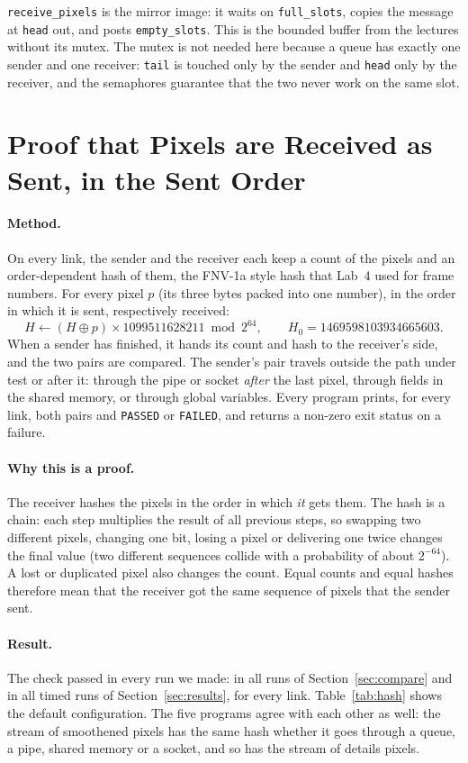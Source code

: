 \documentclass[11pt,a4paper]{article}
\begin{document}
\noindent \texttt{receive\_pixels} is the mirror image: it waits on \texttt{full\_slots}, copies the
message at \texttt{head} out, and posts \texttt{empty\_slots}. This is the bounded buffer from the
lectures without its mutex. The mutex is not needed
here because a queue has exactly one sender and one receiver: \texttt{tail} is touched only by the
sender and \texttt{head} only by the receiver, and the semaphores guarantee that the two never work
on the same slot.

\section{Proof that Pixels are Received as Sent, in the Sent Order}
\label{sec:proof}

\paragraph{Method.} On every link, the sender and the receiver each keep a count of the pixels and
an order-dependent hash of them, the FNV-1a style hash that Lab~4 used for frame numbers. For every
pixel $p$ (its three bytes packed into one number), in the order in which it is sent, respectively
received:
\[ H \leftarrow (H \oplus p) \times 1099511628211 \bmod 2^{64}, \qquad H_0 = 1469598103934665603. \]
When a sender has finished, it hands its count and hash to the receiver's side, and the two pairs are
compared. The sender's pair travels outside the path under test or after it: through the pipe or
socket \emph{after} the last pixel, through fields in the shared memory, or through global variables.
Every program prints, for every link, both pairs and \texttt{PASSED} or \texttt{FAILED}, and returns
a non-zero exit status on a failure.

\paragraph{Why this is a proof.} The receiver hashes the pixels in the order in which \emph{it}
gets them. The hash is a chain: each step multiplies the result of all previous steps, so swapping
two different pixels, changing one bit, losing a pixel or delivering one twice changes the final
value (two different sequences collide with a probability of about $2^{-64}$). A lost or duplicated
pixel also changes the count. Equal counts and equal hashes therefore mean that the receiver got the
same sequence of pixels that the sender sent.

\paragraph{Result.} The check passed in every run we made: in all runs of
Section~\ref{sec:compare} and in all timed runs of Section~\ref{sec:results}, for every link.
Table~\ref{tab:hash} shows the default configuration. The five programs agree with each other as
well: the stream of smoothened pixels has the same hash whether it goes through a queue, a pipe,
shared memory or a socket, and so has the stream of details pixels.
\end{document}
